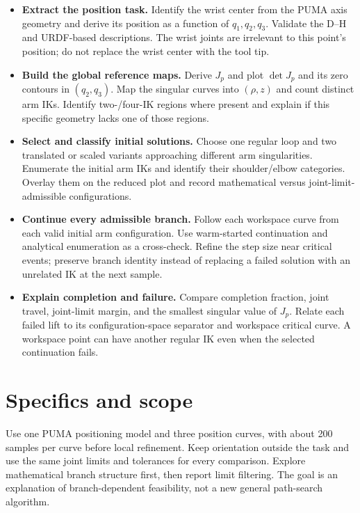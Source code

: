 \documentclass[11pt,a4paper]{article}
\begin{document}
\begin{itemize}
  \item \textbf{Extract the position task.} Identify the wrist center from the PUMA
axis geometry and derive its position as a function of $q_1,q_2,q_3$.
Validate the D--H and URDF-based descriptions. The wrist joints are irrelevant
to this point's position; do not replace the wrist center with the tool tip.

  \item \textbf{Build the global reference maps.} Derive $J_p$ and plot $\det J_p$
and its zero contours in $(q_2,q_3)$. Map the singular curves into $(\rho,z)$
and count distinct arm IKs. Identify two-/four-IK regions where present and
explain if this specific geometry lacks one of those regions.

  \item \textbf{Select and classify initial solutions.} Choose one regular loop and
two translated or scaled variants approaching different arm singularities.
Enumerate the initial arm IKs and identify their shoulder/elbow categories.
Overlay them on the reduced plot and record mathematical versus
joint-limit-admissible configurations.

  \item \textbf{Continue every admissible branch.} Follow each workspace curve from
each valid initial arm configuration. Use warm-started continuation and
analytical enumeration as a cross-check. Refine the step size near critical
events; preserve branch identity instead of replacing a failed solution with
an unrelated IK at the next sample.

  \item \textbf{Explain completion and failure.} Compare completion fraction,
joint travel, joint-limit margin, and the smallest singular value of $J_p$.
Relate each failed lift to its configuration-space separator and workspace
critical curve. A workspace point can have another regular IK even when the
selected continuation fails.
\end{itemize}

\newpage
\section*{Specifics and scope}
Use one PUMA positioning model and three position curves, with about
200 samples per curve before local refinement. Keep orientation outside the
task and use the same joint limits and tolerances for every comparison.
Explore mathematical branch structure first, then report limit filtering.
The goal is an explanation of branch-dependent feasibility, not a new general
path-search algorithm.
\end{document}
